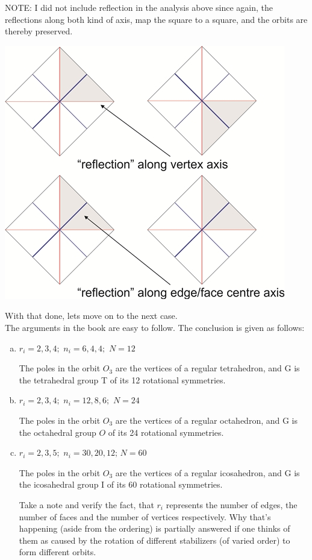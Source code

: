 \documentclass[12pt]{article}
\begin{document}
\par
NOTE: I did not include reflection in the analysis above since again, the reflections along both kind of axis, map the square to a square, and the orbits are thereby preserved.\\
\begin{center}
\includegraphics[width=0.4\linewidth]{square_reflections.jpg}
\end{center}
\vspace{40pt}
With that done, lets move on to the next case.\\
The arguments in the book are easy to follow. The conclusion is given as follows:
\begin{enumerate}[(a)]
\item $r_{i}=2,3,4;\,\,n_{i}=6,4,4;\,\,N=12$
\par
The poles in the orbit $O_{3}$ are the vertices of a regular tetrahedron, and G is the tetrahedral group T of its 12 rotational symmetries.
\item $r_{i}=2,3,4;\,\,n_{i}=12,8,6;\,\,N=24$
\par
The poles in the orbit $O_{3}$ are the vertices of a regular octahedron, and G is the octahedral group $O$ of its 24 rotational symmetries.
\item $r_{i}=2,3,5;\,\,n_{i}=30,20,12;\,N=60$
\par
The poles in the orbit $O_{3}$ are the vertices of a regular icosahedron, and G is the icosahedral group I of its 60 rotational symmetries.\\
\par
Take a note and verify the fact, that $r_{i}$ represents the number of edges, the number of faces and the number of vertices respectively. Why that's happening (aside from the ordering) is partially answered if one thinks of them as caused by the rotation of different stabilizers (of varied order) to form different orbits.\\
\end{enumerate}
\par
\end{document}

